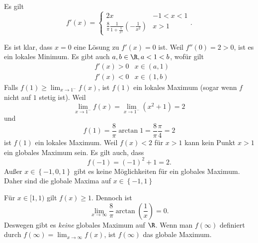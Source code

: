 Es gilt
\[
f'(x)=\begin{cases}
	2x & -1< x < 1 \\
	\frac{8}{\pi}\frac{1}{1+\frac{1}{x^2}}\left( -\frac{1}{x^2} \right) & x>1
\end{cases}
.\] 

Es ist klar, dass $x=0$ eine L\"{o}sung zu $f'(x)=0$ ist. Weil $f''(0)=2>0$, ist es ein lokales Minimum. Es gibt auch $a,b\in \R, a<1<b$, wof\"{u}r gilt
\begin{align*}
	& f'(x)>0 & x\in (a,1)\\
	& f'(x)<0 & x\in (1,b)
\end{align*}
Falls $f(1)\ge \lim_{x \to 1^{-}} f(x)$, ist $f(1)$ ein lokales Maximum (sogar wenn $f$ nicht auf $1$ stetig ist). Weil
\[
	\lim_{x \to 1^{-}} f(x)=\lim_{x \to 1^{-}} \left( x^2+1 \right) =2\] 
	und
	\[
	f(1)=\frac{8}{\pi}\arctan 1=\frac{8}{\pi}\frac{\pi}{4}=2\] 
	ist $f(1)$ ein lokales Maximum. Weil $f(x)<2$ f\"{u}r $x>1$ kann kein Punkt $x>1$ ein globales Maximum sein. Es gilt auch, dass
	\[
	f(-1)=(-1)^2+1=2
	.\] 
	Außer $x\in \left\{ -1,0,1 \right\} $ gibt es keine M\"{o}glichkeiten f\"{u}r ein globales Maximum. Daher sind die globale Maxima auf $x\in \left\{ -1,1 \right\} $ 

	F\"{u}r $x\in [1,1)$ gilt $f(x)\ge 1$. Dennoch ist
	\[
	\lim_{x \to \infty} \frac{8}{\pi}\arctan\left( \frac{1}{x} \right) =0
	.\] 
	Deswegen gibt es \emph{keine} globales Maximum auf $\R$. Wenn man $f(\infty)$ definiert durch $f(\infty)=\lim_{x \to \infty} f(x)$, ist $f(\infty)$ das globale Maximum.

